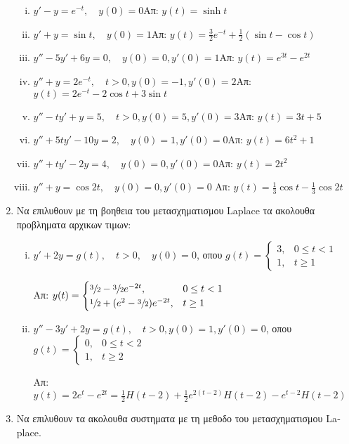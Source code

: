 \begin{enumerate}
\begin{enumerate}[i)]
\item $y'-y=e^{-t},\quad y(0)=0$\hfill Απ: $y(t)=\sinh t$
\item $y'+y=\sin t,\quad y(0)=1$\hfill Απ: $y(t)=\frac{3}{2}e^{-t}+\frac{1}{2}(\sin t-\cos t)$
\item $y''-5y'+6y=0,\quad y(0)=0, y'(0)=1$\hfill Απ: $y(t)=e^{3t}-e^{2t}$
\item $y''+y=2e^{-t},\quad t>0, y(0)=-1, y'(0)=2$\hfill Απ: $y(t)=2e^{-t}-2\cos t+3\sin t$
\item $y''-ty'+y=5, \quad t>0, y(0)=5, y'(0)=3$\hfill Απ: $y(t)=3t+5$
\item $y'' +5ty'-10y=2, \quad y(0)=1, y'(0)=0$\hfill Απ: $y(t)=6t^2+1$
\item $y'' +ty'-2y=4, \quad y(0)=0, y'(0)=0$\hfill Απ: $y(t)=2t^2$
\item $y''+y =\cos 2t, \quad y(0)=0, y'(0)=0$ \hfill Απ: $y(t)=\frac{1}{3}\cos t-\frac{1}{3}\cos 2t$
\end{enumerate}

\item Να επιλυθουν με τη βοηθεια του μετασχηματισμου \textlatin{Laplace} τα ακολουθα προβληματα αρχικων τιμων:

\begin{enumerate}[i)]
\item $y'+2y=g(t),\quad t>0,\quad y(0)=0$, οπου $g(t)=\begin{cases}3, & 0\leq t<1 \\ 1, & t\geq 1\end{cases}$

\hfill Απ: $y(t)=\begin{cases} \sfrac{3}{2}-\sfrac{3}{2}e^{-2t},& 0\leq t<1 \\ \sfrac{1}{2}+(e^2-\sfrac{3}{2})e^{-2t}, & t\geq 1\end{cases}$

\item $y''-3y'+2y=g(t),\quad t>0, y(0)=1, y'(0)=0$, οπου $g(t)=\begin{cases} 0, & 0\leq t<2 \\ 1, & t\geq 2\end{cases}$

\hfill Απ: $y(t)=2e^t-e^{2t}=\frac{1}{2}H(t-2)+\frac{1}{2}e^{2(t-2)}H(t-2)-e^{t-2}H(t-2)$
\end{enumerate}






\item Να επιλυθουν τα ακολουθα συστηματα με τη μεθοδο του μετασχηματισμου \textlatin{Laplace}.


\end{enumerate}
